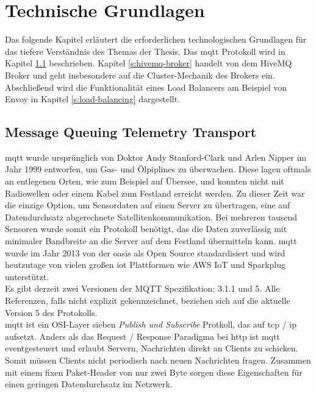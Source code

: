 \section{Technische Grundlagen} \label{s:basics}
Das folgende Kapitel erläutert die erforderlichen technologischen Grundlagen für das tiefere Verständnis des Themas der Thesis.
Das \acs{mqtt} Protokoll wird in Kapitel \ref{s:mqtt} beschrieben.
Kapitel \ref{s:hivemq-broker} handelt von dem HiveMQ Broker und geht insbesondere auf die Cluster-Mechanik des Brokers ein.
Abschlie{\ss}end wird die Funktionalität eines Load Balancers am Beispiel von Envoy in Kapitel \ref{s:load-balancing} dargestellt.

\subsection{Message Queuing Telemetry Transport} \label{s:mqtt}
\acf{mqtt} wurde ursprünglich von Doktor Andy Stanford-Clark und Arlen Nipper im Jahr 1999 entworfen, um Gas- und Ölpiplines zu überwachen. Diese lagen oftmals an entlegenen Orten, wie zum Beispiel auf Übersee, und konnten nicht mit Radiowellen oder einem Kabel zum Festland erreicht werden. Zu dieser Zeit war die einzige Option, um Sensordaten auf einen Server zu übertragen, eine auf Datendurchsatz abgerechnete Satellitenkommunikation. Bei mehreren tausend Sensoren wurde somit ein Protokoll benötigt, das die Daten zuverlässig mit minimaler Bandbreite an die Server auf dem Festland übermitteln kann.
\ac{mqtt} wurde im Jahr 2013 von der \ac{oasis} als Open Source standardisiert und wird heutzutage von vielen gro{\ss}en \ac{iot} Plattformen wie AWS IoT und Sparkplug unterstützt.
\cite{WhatMQTTDefinition}\\
Es gibt derzeit zwei Versionen der MQTT Spezifikation: 3.1.1 und 5. Alle Referenzen, falls nicht explizit gekennzeichnet, beziehen sich auf die aktuelle Version 5 des Protokolls.\\
\ac{mqtt} ist ein OSI-Layer sieben \textit{Publish und Subscribe} Protkoll, das auf \acs{tcp} / \acs{ip} aufsetzt. Anders als das Request / Response Paradigma bei \acs{http} ist \ac{mqtt} eventgesteuert und erlaubt Servern, Nachrichten direkt an Clients zu schicken. Somit müssen Clients nicht periodisch nach neuen Nachrichten fragen. Zusammen mit einem fixen Paket-Header von nur zwei Byte sorgen diese Eigenschaften für einen geringen Datendurchsatz im Netzwerk.\cite{WhatMQTTDefinition}


